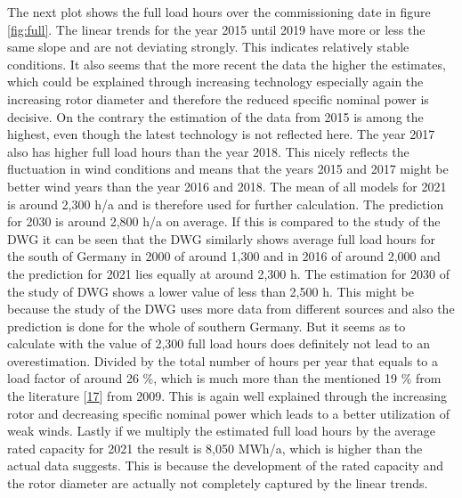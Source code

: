 \documentclass[a4paper,11pt]{article}
\begin{document}
The next plot shows the full load hours over the commissioning date in figure \ref{fig:full}. The linear trends for the year 2015 until 2019 have more or less the same slope and are not deviating strongly. This indicates relatively stable conditions. It also seems that the more recent the data the higher the estimates, which could be explained through increasing technology especially again the increasing rotor diameter and therefore the reduced specific nominal power is decisive. On the contrary the estimation of the data from 2015 is among the highest, even though the latest technology is not reflected here. The year 2017 also has higher full load hours than the year 2018. This nicely reflects the fluctuation in wind conditions and means that the years 2015 and 2017 might be better wind years than the year 2016 and 2018. The mean of all models for 2021 is around 2,300 h/a and is therefore used for further calculation. The prediction for 2030 is around 2,800 h/a on average. If this is compared to the study of the DWG it can be seen that the DWG similarly shows average full load hours for the south of Germany in 2000 of around 1,300 and in 2016 of around 2,000 and the prediction for 2021 lies equally at around 2,300 h. The estimation for 2030 of the study of DWG shows a lower value of less than 2,500 h. This might be because the study of the DWG uses more data from different sources and also the prediction is done for the whole of southern Germany. But it seems as to calculate with the value of 2,300 full load hours does definitely not lead to an overestimation. Divided by the total number of hours per year that equals to a load factor of around 26 \%, which is much more than the mentioned 19 \% from the literature {[}\protect\hyperlink{ref-DavidJCMacKay.2009}{17}{]} from 2009. This is again well explained through the increasing rotor and decreasing specific nominal power which leads to a better utilization of weak winds. Lastly if we multiply the estimated full load hours by the average rated capacity for 2021 the result is 8,050 MWh/a, which is higher than the actual data suggests. This is because the development of the rated capacity and the rotor diameter are actually not completely captured by the linear trends.
\end{document}
